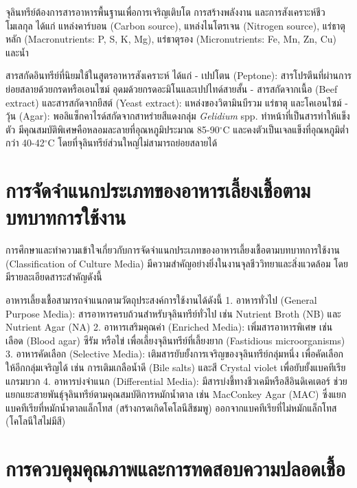 จุลินทรีย์ต้องการสารอาหารพื้นฐานเพื่อการเจริญเติบโต การสร้างพลังงาน และการสังเคราะห์ชีวโมเลกุล ได้แก่ แหล่งคาร์บอน (Carbon source), แหล่งไนโตรเจน (Nitrogen source), แร่ธาตุหลัก (Macronutrients: P, S, K, Mg), แร่ธาตุรอง (Micronutrients: Fe, Mn, Zn, Cu) และน้ำ

สารสกัดอินทรีย์ที่นิยมใช้ในสูตรอาหารสังเคราะห์ ได้แก่ 
- เปปโตน (Peptone): สารโปรตีนที่ผ่านการย่อยสลายด้วยกรดหรือเอนไซม์ อุดมด้วยกรดอะมิโนและเปปไทด์สายสั้น
- สารสกัดจากเนื้อ (Beef extract) และสารสกัดจากยีสต์ (Yeast extract): แหล่งของวิตามินบีรวม แร่ธาตุ และโคเอนไซม์
- วุ้น (Agar): พอลิแซ็กคาไรด์สกัดจากสาหร่ายสีแดงกลุ่ม \textit{Gelidium} spp. ทำหน้าที่เป็นสารทำให้แข็งตัว มีคุณสมบัติพิเศษคือหลอมละลายที่อุณหภูมิประมาณ 85-90$^{\circ}$C และคงตัวเป็นเจลแข็งที่อุณหภูมิต่ำกว่า 40-42$^{\circ}$C โดยที่จุลินทรีย์ส่วนใหญ่ไม่สามารถย่อยสลายได้

\section{การจัดจำแนกประเภทของอาหารเลี้ยงเชื้อตามบทบาทการใช้งาน}

การศึกษาและทำความเข้าใจเกี่ยวกับการจัดจำแนกประเภทของอาหารเลี้ยงเชื้อตามบทบาทการใช้งาน (Classification of Culture Media) มีความสำคัญอย่างยิ่งในงานจุลชีววิทยาและสิ่งแวดล้อม โดยมีรายละเอียดสาระสำคัญดังนี้

อาหารเลี้ยงเชื้อสามารถจำแนกตามวัตถุประสงค์การใช้งานได้ดังนี้ 
1. อาหารทั่วไป (General Purpose Media): สารอาหารครบถ้วนสำหรับจุลินทรีย์ทั่วไป เช่น Nutrient Broth (NB) และ Nutrient Agar (NA)
2. อาหารเสริมคุณค่า (Enriched Media): เพิ่มสารอาหารพิเศษ เช่น เลือด (Blood agar) ซีรัม หรือไข่ เพื่อเลี้ยงจุลินทรีย์ที่เลี้ยงยาก (Fastidious microorganisms)
3. อาหารคัดเลือก (Selective Media): เติมสารยับยั้งการเจริญของจุลินทรีย์กลุ่มหนึ่ง เพื่อคัดเลือกให้อีกกลุ่มเจริญได้ เช่น การเติมเกลือน้ำดี (Bile salts) และสี Crystal violet เพื่อยับยั้งแบคทีเรียแกรมบวก
4. อาหารบ่งจำแนก (Differential Media): มีสารบ่งชี้ทางชีวเคมีหรือสีอินดิเคเตอร์ ช่วยแยกแยะสายพันธุ์จุลินทรีย์ตามคุณสมบัติการหมักน้ำตาล เช่น MacConkey Agar (MAC) ซึ่งแยกแบคทีเรียที่หมักน้ำตาลแล็กโทส (สร้างกรดเกิดโคโลนีสีชมพู) ออกจากแบคทีเรียที่ไม่หมักแล็กโทส (โคโลนีใสไม่มีสี)

\section{การควบคุมคุณภาพและการทดสอบความปลอดเชื้อ}

